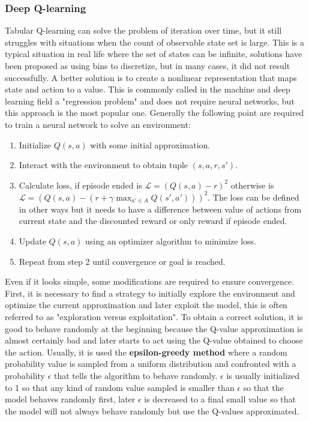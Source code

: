 \subsubsection{Deep Q-learning}
Tabular Q-learning can solve the problem of iteration over time, but it still struggles with situations when the count of observable state set is large. This is a typical situation in real life where the set of states can be infinite, solutions have been proposed as using bins to discretize, but in many cases, it did not result successfully.
A better solution is to create a nonlinear representation that maps state and action to a value. This is commonly called in the machine and deep learning field a "regression problem" and does not require neural networks, but this approach is the most popular one.
Generally the following point are required to train a neural network to solve an environment:
\begin{enumerate}
	\item Initialize $Q(s,a)$ with some initial approximation.
	\item Interact with the environment to obtain tuple $(s,a,r,s')$.
	\item Calculate loss, if episode ended is $\mathcal{L} = (Q(s,a) - r)^2$ otherwise is $\mathcal{L} = (Q(s,a) - (r + \gamma \max_{a' \in A} Q(s',a')))^2$. The loss can be defined in other ways but it needs to have a difference between value of actions from current state and the discounted reward or only reward if episode ended.
	\item Update $Q(s, a)$ using an optimizer algorithm to minimize loss.
	\item Repeat from step 2 until convergence or goal is reached.
\end{enumerate}
Even if it looks simple, some modifications are required to ensure convergence.
First, it is necessary to find a strategy to initially explore the environment and optimize the current approximation and later exploit the model, this is often referred to as "exploration versus exploitation". To obtain a correct solution, it is good to behave randomly at the beginning because the Q-value approximation is almost certainly bad and later starts to act using the Q-value obtained to choose the action. Usually, it is used the \textbf{epsilon-greedy method} where a random probability value is sampled from a uniform distribution and confronted with a probability $\epsilon$  that tells the algorithm to behave randomly. $\epsilon$ is usually initialized to 1 so that any kind of random value sampled is smaller than $\epsilon$ so that the model behaves randomly first, later $\epsilon$ is decreased to a final small value so that the model will not always behave randomly but use the Q-values approximated.\\
